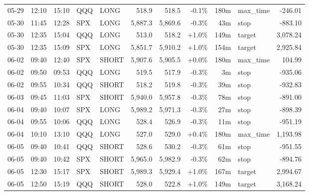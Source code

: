 \documentclass[11pt,a4paper,twoside]{article}
\begin{document}
\begin{center}
\begin{longtable}{>{\color{txtmain}}l l l l l r r r r >{\color{txtmain}}l r}
05-29 & 12:10 & 15:10 & QQQ & LONG & 518.9 & 518.5 & \textcolor{lossred}{-0.1\%} & 180m & max\_time & \textcolor{lossred}{-246.01} \\
05-30 & 11:45 & 12:28 & SPX & LONG & 5,887.3 & 5,869.6 & \textcolor{lossred}{-0.3\%} & 43m & stop & \textcolor{lossred}{-883.10} \\
05-30 & 12:35 & 15:04 & QQQ & LONG & 513.0 & 518.2 & \textcolor{wingreen}{+1.0\%} & 149m & target & \textcolor{wingreen}{3,078.24} \\
05-30 & 12:35 & 15:09 & SPX & LONG & 5,851.7 & 5,910.2 & \textcolor{wingreen}{+1.0\%} & 154m & target & \textcolor{wingreen}{2,925.84} \\
06-02 & 09:40 & 12:40 & SPX & SHORT & 5,907.6 & 5,905.5 & \textcolor{wingreen}{+0.0\%} & 180m & max\_time & \textcolor{wingreen}{104.99} \\
06-02 & 09:50 & 09:53 & QQQ & LONG & 519.5 & 517.9 & \textcolor{lossred}{-0.3\%} & 3m & stop & \textcolor{lossred}{-935.06} \\
06-02 & 09:55 & 10:34 & QQQ & SHORT & 518.2 & 519.8 & \textcolor{lossred}{-0.3\%} & 39m & stop & \textcolor{lossred}{-932.83} \\
06-03 & 09:45 & 11:03 & SPX & SHORT & 5,940.0 & 5,957.8 & \textcolor{lossred}{-0.3\%} & 78m & stop & \textcolor{lossred}{-891.00} \\
06-04 & 09:40 & 10:07 & SPX & LONG & 5,989.2 & 5,971.3 & \textcolor{lossred}{-0.3\%} & 27m & stop & \textcolor{lossred}{-898.39} \\
06-04 & 09:55 & 10:06 & QQQ & LONG & 528.4 & 526.9 & \textcolor{lossred}{-0.3\%} & 11m & stop & \textcolor{lossred}{-951.19} \\
06-04 & 10:10 & 13:10 & QQQ & LONG & 527.0 & 529.0 & \textcolor{wingreen}{+0.4\%} & 180m & max\_time & \textcolor{wingreen}{1,193.98} \\
06-05 & 09:40 & 10:41 & QQQ & SHORT & 528.6 & 530.2 & \textcolor{lossred}{-0.3\%} & 61m & stop & \textcolor{lossred}{-951.55} \\
06-05 & 09:40 & 10:42 & SPX & SHORT & 5,965.0 & 5,982.9 & \textcolor{lossred}{-0.3\%} & 62m & stop & \textcolor{lossred}{-894.76} \\
06-05 & 12:30 & 15:17 & SPX & SHORT & 5,989.3 & 5,929.4 & \textcolor{wingreen}{+1.0\%} & 167m & target & \textcolor{wingreen}{2,994.67} \\
06-05 & 12:50 & 15:19 & QQQ & SHORT & 528.0 & 522.8 & \textcolor{wingreen}{+1.0\%} & 149m & target & \textcolor{wingreen}{3,168.24} \\

\end{longtable}
\end{center}
\end{document}
